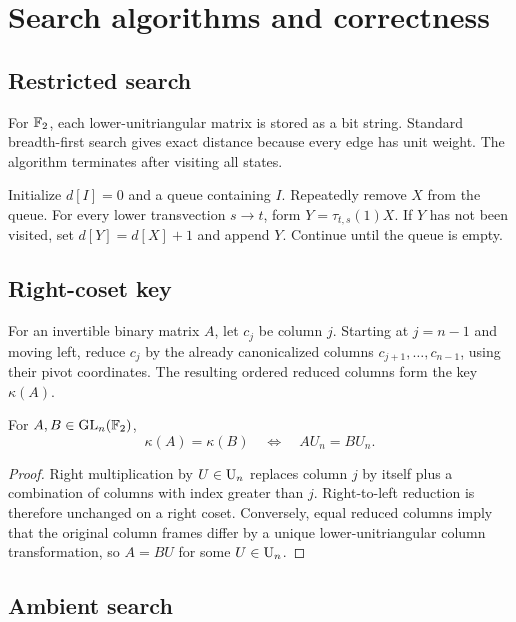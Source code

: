 \section{Search algorithms and correctness}\label{app:algorithms}

\subsection{Restricted search}

For $\mathbb F_2$, each lower-unitriangular matrix is stored as a bit string.  Standard breadth-first search gives exact distance because every edge has unit weight.  The algorithm terminates after visiting all states.

\begin{algorithm}
Initialize $d[I]=0$ and a queue containing $I$.  Repeatedly remove $X$ from the queue.  For every lower transvection $s\to t$, form $Y=\tau_{t,s}(1)X$.  If $Y$ has not been visited, set $d[Y]=d[X]+1$ and append $Y$.  Continue until the queue is empty.
\end{algorithm}

\subsection{Right-coset key}

For an invertible binary matrix $A$, let $c_j$ be column $j$.  Starting at $j=n-1$ and moving left, reduce $c_j$ by the already canonicalized columns $c_{j+1},\ldots,c_{n-1}$, using their pivot coordinates.  The resulting ordered reduced columns form the key $\kappa(A)$.

\begin{lemma}
For $A,B\in\operatorname{GL}_n(\mathbb F_2)$,
\[
\kappa(A)=\kappa(B)
\quad\Longleftrightarrow\quad
AU_n=BU_n.
\]
\end{lemma}

\begin{proof}
Right multiplication by $U\in\operatorname{U}_n$ replaces column $j$ by itself plus a combination of columns with index greater than $j$.  Right-to-left reduction is therefore unchanged on a right coset.  Conversely, equal reduced columns imply that the original column frames differ by a unique lower-unitriangular column transformation, so $A=BU$ for some $U\in\operatorname{U}_n$.
\end{proof}

\subsection{Ambient search}

